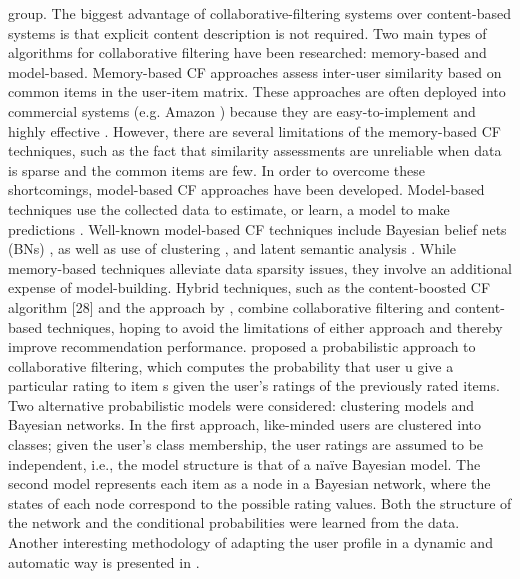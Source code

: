 \documentclass[11pt,oneside]{book}
\begin{document}
group. The biggest advantage of collaborative-filtering systems over
content-based systems is that explicit content description is not
required. Two main types of algorithms for collaborative filtering
have been researched: memory-based and model-based.  Memory-based CF
approaches assess inter-user similarity based on common items in the
user-item matrix. These approaches are often deployed into commercial
systems (e.g. Amazon ) because they are easy-to-implement and highly
effective \citep{vapnik1999overview}. However, there are several limitations of the
memory-based CF techniques, such as the fact that similarity
assessments are unreliable when data is sparse and the common items
are few. In order to overcome these shortcomings, model-based CF
approaches have been developed. Model-based techniques use the
collected data to estimate, or learn, a model to make predictions
\citep{breese98}. Well-known model-based CF techniques include Bayesian belief
nets (BNs) \citep{breese98}, as well as use of clustering \citep{ungar1998clustering},\citep{zhu2009analyzing} and latent
semantic analysis \citep{hofmann2004latent}. While memory-based techniques alleviate data
sparsity issues, they involve an additional expense of model-building.
Hybrid techniques, such as the content-boosted CF algorithm [28] and
the approach by \citep{gong2009combining}, combine collaborative filtering and
content-based techniques, hoping to avoid the limitations of either
approach and thereby improve recommendation performance. \citep{breese98} proposed a probabilistic approach to collaborative filtering,
which computes the probability that user u give a particular rating to
item s given the user’s ratings of the previously rated items. Two
alternative probabilistic models were considered: clustering models
and Bayesian networks. In the first approach, like-minded users are
clustered into classes; given the user’s class membership, the user
ratings are assumed to be independent, i.e., the model structure is
that of a naïve Bayesian model. The second model represents each item
as a node in a Bayesian network, where the states of each node
correspond to the possible rating values. Both the structure of the
network and the conditional probabilities were learned from the
data. Another interesting methodology of adapting the user profile in
a dynamic and automatic way is presented in \citep{marin2013dynamic}.
\end{document}
